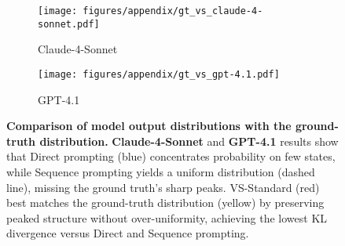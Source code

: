 \begin{figure}[htbp]
    \centering
    \begin{subfigure}{\linewidth}
        \centering
        \texttt{[image: figures/appendix/gt\_vs\_claude-4-sonnet.pdf]}
        \caption{Claude-4-Sonnet}
        \label{fig:claude_distribution}
    \end{subfigure}
    
    \vspace{0.5cm}
    
    \begin{subfigure}{\linewidth}
        \centering
        \texttt{[image: figures/appendix/gt\_vs\_gpt-4.1.pdf]}
        \caption{GPT-4.1}
        \label{fig:gpt_distribution}
    \end{subfigure}
    \caption{\textbf{Comparison of model output distributions with the ground-truth distribution.} 
 \textbf{Claude-4-Sonnet} and  \textbf{GPT-4.1} results show that Direct prompting (blue) concentrates probability on few states, while Sequence prompting yields a uniform distribution (dashed line), missing the ground truth's sharp peaks. VS-Standard (red) best matches the ground-truth distribution (yellow) by preserving peaked structure without over-uniformity, achieving the lowest KL divergence versus Direct and Sequence prompting.}
    \label{fig:state_distributions}
\end{figure}


